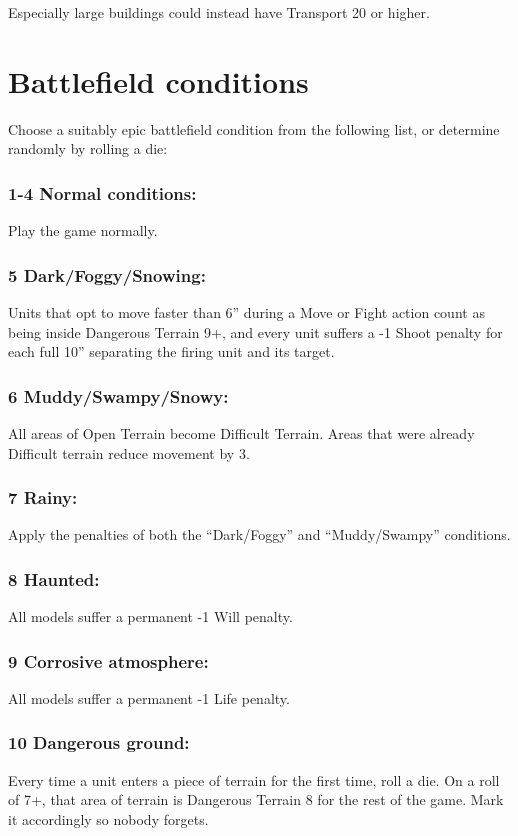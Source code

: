 \begin{multicols}{2}
Especially large buildings could instead have Transport 20 or higher.




\section*{Battlefield conditions}
Choose a suitably epic battlefield condition from the following list, or determine randomly by rolling a die:

\subsubsection*{1-4 Normal conditions:} Play the game normally.

\subsubsection*{5 Dark/Foggy/Snowing:} Units that opt to move faster than 6'' during a Move or Fight action count as being inside Dangerous Terrain 9+, and every unit suffers a -1 Shoot penalty for each full 10'' separating the firing unit and its target.

\subsubsection*{6 Muddy/Swampy/Snowy:} All areas of Open Terrain become Difficult Terrain. Areas that were already Difficult terrain reduce movement by 3.

\subsubsection*{7 Rainy:} Apply the penalties of both the ``Dark/Foggy'' and ``Muddy/Swampy'' conditions.

\subsubsection*{8 Haunted:} All models suffer a permanent -1 Will penalty.

\subsubsection*{9 Corrosive atmosphere:} All models suffer a permanent -1 Life penalty.

\subsubsection*{10 Dangerous ground:} Every time a unit enters a piece of terrain for the first time, roll a die. On a roll of 7+, that area of terrain is Dangerous Terrain 8 for the rest of the game. Mark it accordingly so nobody forgets.





\end{multicols}
